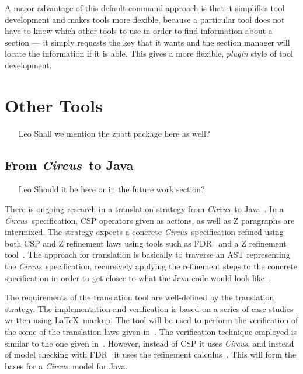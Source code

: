 \documentclass{llncs}
\newcommand{\Circus}{{\sf\slshape Circus}}
\begin{document}
  A major advantage of this default command approach is that it simplifies
  tool development and makes tools more flexible, because a particular
  tool does not have to know which other tools to use in order to
  find information about a section --- it simply requests the key that
  it wants and the section manager will locate the information if it is able.
  This gives a more flexible, \emph{plugin} style of tool development.


\section{Other Tools}
\label{other-tools}

\begin{itemize}
    \item[Leo] Shall we mention the zpatt package here as well?
\end{itemize}

\subsection{From \Circus\ to Java}

\begin{itemize}
    \item[Leo] Should it be here or in the future work section?
\end{itemize}

There is ongoing research in a translation strategy from \Circus\ to
Java~\cite{angela-2005}.  In a \Circus\ specification, CSP operators
given as actions, as well as Z paragraphs are intermixed.  The
strategy expects a concrete \Circus\ specification refined using both
CSP and Z refinement laws using tools such as
FDR~\cite{csp.tools:fdrm} and a Z refinement tool~\cite{angela-2003}.
The approach for translation is basically to traverse an AST
representing the \Circus\ specification, recursively applying the
refinement steps to the concrete specification in order to get closer
to what the Java code would look like~\cite{marcel-2004}.

The requirements of the translation tool are well-defined by the
translation strategy.  The implementation and verification is based on
a series of case studies written using \LaTeX\ markup.  The tool will
be used to perform the verification of the some of the translation
laws given in~\cite{marcel-2004}.  The verification technique employed
is similar to the one given in~\cite{welch-martin2000}.  However,
instead of CSP it uses \Circus, and instead of model checking with
FDR~\cite{csp.tools:fdrm} it uses the refinement
calculus~\cite{fm.ref:morgan}.  This will form the bases for a
\Circus\ model for Java.
\end{document}
